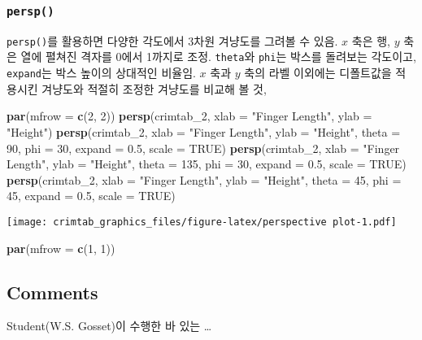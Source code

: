 \documentclass[
]{article}
\newenvironment{Shaded}{\begin{snugshade}}{\end{snugshade}}
\newcommand{\DataTypeTok}[1]{\textcolor[rgb]{0.13,0.29,0.53}{#1}}
\newcommand{\DecValTok}[1]{\textcolor[rgb]{0.00,0.00,0.81}{#1}}
\newcommand{\FloatTok}[1]{\textcolor[rgb]{0.00,0.00,0.81}{#1}}
\newcommand{\KeywordTok}[1]{\textcolor[rgb]{0.13,0.29,0.53}{\textbf{#1}}}
\newcommand{\NormalTok}[1]{#1}
\newcommand{\OtherTok}[1]{\textcolor[rgb]{0.56,0.35,0.01}{#1}}
\newcommand{\StringTok}[1]{\textcolor[rgb]{0.31,0.60,0.02}{#1}}
\begin{document}
\hypertarget{persp}{%
\subsubsection{\texorpdfstring{\texttt{persp()}}{persp()}}\label{persp}}

\texttt{persp()}를 활용하면 다양한 각도에서 3차원 겨냥도를 그려볼 수
있음. \(x\) 축은 행, \(y\) 축은 열에 펼쳐진 격자를 0에서 1까지로 조정.
\texttt{theta}와 \texttt{phi}는 박스를 돌려보는 각도이고,
\texttt{expand}는 박스 높이의 상대적인 비율임. \(x\) 축과 \(y\) 축의
라벨 이외에는 디폴트값을 적용시킨 겨냥도와 적절히 조정한 겨냥도를 비교해
볼 것,

\begin{Shaded}
\begin{Highlighting}[]
\KeywordTok{par}\NormalTok{(}\DataTypeTok{mfrow =} \KeywordTok{c}\NormalTok{(}\DecValTok{2}\NormalTok{, }\DecValTok{2}\NormalTok{))}
\KeywordTok{persp}\NormalTok{(crimtab_}\DecValTok{2}\NormalTok{, }
      \DataTypeTok{xlab =} \StringTok{"Finger Length"}\NormalTok{, }
      \DataTypeTok{ylab =} \StringTok{"Height"}\NormalTok{)}
\KeywordTok{persp}\NormalTok{(crimtab_}\DecValTok{2}\NormalTok{, }
      \DataTypeTok{xlab =} \StringTok{"Finger Length"}\NormalTok{, }
      \DataTypeTok{ylab =} \StringTok{"Height"}\NormalTok{, }
      \DataTypeTok{theta =} \DecValTok{90}\NormalTok{, }
      \DataTypeTok{phi =} \DecValTok{30}\NormalTok{, }
      \DataTypeTok{expand =} \FloatTok{0.5}\NormalTok{, }
      \DataTypeTok{scale =} \OtherTok{TRUE}\NormalTok{)}
\KeywordTok{persp}\NormalTok{(crimtab_}\DecValTok{2}\NormalTok{, }
      \DataTypeTok{xlab =} \StringTok{"Finger Length"}\NormalTok{, }
      \DataTypeTok{ylab =} \StringTok{"Height"}\NormalTok{, }
      \DataTypeTok{theta =} \DecValTok{135}\NormalTok{, }
      \DataTypeTok{phi =} \DecValTok{30}\NormalTok{, }
      \DataTypeTok{expand =} \FloatTok{0.5}\NormalTok{, }
      \DataTypeTok{scale =} \OtherTok{TRUE}\NormalTok{)}
\KeywordTok{persp}\NormalTok{(crimtab_}\DecValTok{2}\NormalTok{, }
      \DataTypeTok{xlab =} \StringTok{"Finger Length"}\NormalTok{, }
      \DataTypeTok{ylab =} \StringTok{"Height"}\NormalTok{, }
      \DataTypeTok{theta =} \DecValTok{45}\NormalTok{, }
      \DataTypeTok{phi =} \DecValTok{45}\NormalTok{, }
      \DataTypeTok{expand =} \FloatTok{0.5}\NormalTok{, }
      \DataTypeTok{scale =} \OtherTok{TRUE}\NormalTok{)}
\end{Highlighting}
\end{Shaded}

\texttt{[image: crimtab\_graphics\_files/figure-latex/perspective plot-1.pdf]}

\begin{Shaded}
\begin{Highlighting}[]
\KeywordTok{par}\NormalTok{(}\DataTypeTok{mfrow =} \KeywordTok{c}\NormalTok{(}\DecValTok{1}\NormalTok{, }\DecValTok{1}\NormalTok{))}
\end{Highlighting}
\end{Shaded}

\hypertarget{comments}{%
\subsection{Comments}\label{comments}}

Student(W.S. Gosset)이 수행한 바 있는 \ldots{}
\end{document}
